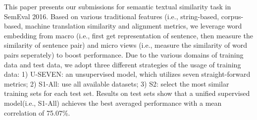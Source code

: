 This paper presents our submissions for semantic textual similarity task in SemEval 2016. Based on various traditional features (i.e.,  string-based, corpus-based, machine translation similarity and alignment metrics, we leverage word embedding from macro (i.e., first get representation of sentence, then measure the similarity of sentence pair) and micro views (i.e., measure the similarity of word pairs seperately) to boost performance. Due to the various domains of training data and test data, we adopt three different strategies of the usage of training data: 1) U-SEVEN: an unsupervised model, which utilizes seven straight-forward metrics; 2) S1-All: use all available datasets; 3) S2: select the most similar training sets for each test set. Results on test sets show that a unified supervised model(i.e., S1-All) achieves the best averaged performance with a mean correlation of 75.07\%.
